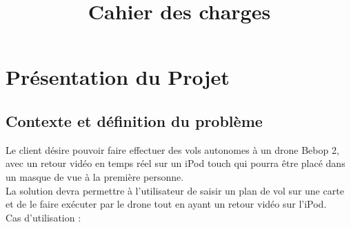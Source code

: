 \documentclass{article}
\title{Cahier des charges}
\begin{document}
\sectionfont{\underline}

\maketitle
\section{Présentation du Projet}
	\subsection{Contexte et définition du problème}
		Le client désire pouvoir faire effectuer des vols autonomes à un drone Bebop 2, avec un retour vidéo en temps réel sur un iPod touch qui pourra être placé dans un masque de vue à la première personne.\\
		La solution devra permettre à l'utilisateur de saisir un plan de vol sur une carte et de le faire exécuter par le drone tout en ayant un retour vidéo sur l'iPod.\\
		\bigbreak
	    Cas d'utilisation :\\
\end{document}
